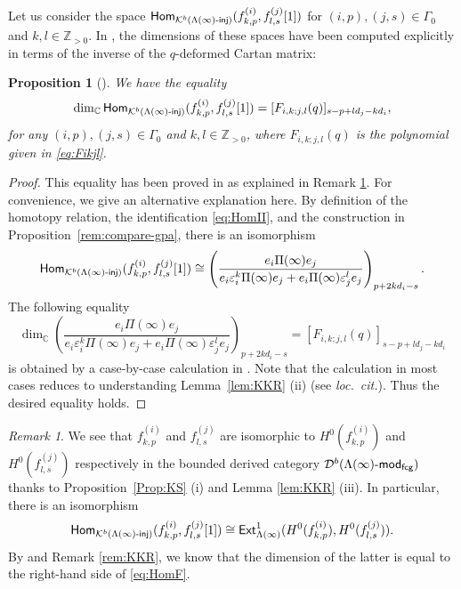 \documentclass[12pt]{amsart}
\newtheorem{proposition}[theorem]{Proposition}
\theoremstyle{definition}
\theoremstyle{remark}
\newtheorem{remark}[theorem]{Remark}
\numberwithin{equation}{section}
\newcommand{\opname}[1]{\operatorname{\mathsf{#1}}}
\newcommand{\Ext}{\opname{Ext}}
\newcommand{\Hom}{\opname{Hom}}
\newcommand{\injc}{\mathchar`-\mathsf{inj}}
\begin{document}
Let us consider the space $\Hom_{\mathcal{K}^b(\Lambda(\infty)\injc)}(f^{(i)}_{k,p}, f^{(j)}_{l,s}[1])$ for $(i,p), (j,s) \in \Gamma_0$ and $k,l \in \mathbb{Z}_{> 0}$. 
In \cite[\S5 \& Appendix A]{FM}, the dimensions of these spaces have been computed explicitly in terms of the inverse of the $q$-deformed Cartan matrix:
\begin{proposition}[{\cite[Propositions 5.6 \& A.1]{FM}}]\label{Prop:HomF}
We have the equality
\begin{equation}\label{eq:HomF}
    \dim_{\mathbb{C}} \Hom_{\mathcal{K}^b(\Lambda(\infty)\injc)}(f^{(i)}_{k,p}, f^{(j)}_{l,s}[1]) = [F_{i,k;j,l}(q)]_{s-p+ld_j-kd_i},
\end{equation}
for any $(i,p), (j,s) \in \Gamma_0$ and $k,l \in \mathbb{Z}_{> 0}$, 
where $F_{i,k;j,l}(q)$ is the polynomial given in \eqref{eq:Fikjl}.
\end{proposition}  
\begin{proof}
    This equality has been proved in \cite[\S5 \& Appendix A]{FM} as explained in Remark \ref{rem:HomF}.
    For convenience, we give an alternative explanation here.
    By definition of the homotopy relation, the identification \eqref{eq:HomII}, and the construction in Proposition~\ref{rem:compare-gpa}, there is an isomorphism
    \begin{equation}\label{eq:ePie}
        \Hom_{\mathcal{K}^b(\Lambda(\infty)\injc)}(f^{(i)}_{k,p}, f^{(j)}_{l,s}[1]) \cong \left(\frac{e_i \Pi(\infty) e_j}{e_i\varepsilon_i^k\Pi(\infty)e_j + e_i\Pi(\infty)\varepsilon_j^l e_j}\right)_{p+2kd_i-s}.
    \end{equation}
The following equality
\[\dim_{\mathbb{C}}\left(\frac{e_i \Pi(\infty) e_j}{e_i\varepsilon_i^k\Pi(\infty)e_j + e_i\Pi(\infty)\varepsilon_j^l e_j}\right)_{p+2kd_i-s} = [F_{i,k;j,l}(q)]_{s-p+ld_j-kd_i}\]
is obtained by a case-by-case calculation in \cite[Propositions 5.6 \& A.1]{FM}. Note that the calculation in most cases reduces to understanding Lemma~\ref{lem:KKR} (ii) (see \textit{loc.~cit.}). Thus the desired equality holds.
\end{proof}
\begin{remark}\label{rem:HomF}
    We see that $f^{(i)}_{k,p}$ and $f^{(j)}_{l,s}$ are isomorphic to $H^0(f^{(i)}_{k,p})$ and $H^0(f^{(j)}_{l,s})$ respectively in the bounded derived category $\mathcal{D}^b(\Lambda(\infty)\mathchar`-\mathsf{mod}_\mathsf{fcg})$ thanks to Proposition~\ref{Prop:KS} (i) and Lemma \ref{lem:KKR} (iii). In particular, there is an isomorphism $$\Hom_{\mathcal{K}^b(\Lambda(\infty)\injc)}(f^{(i)}_{k,p}, f^{(j)}_{l,s}[1])\cong \Ext^1_{\Lambda(\infty)}(H^0(f^{(i)}_{k,p}), H^0(f^{(j)}_{l,s})).$$
By \cite[Propositions 5.6 \& A.1]{FM} and Remark \ref{rem:KKR}, we know that the dimension of the latter is equal to the right-hand side of \eqref{eq:HomF}. 
\end{remark}
\end{document}
